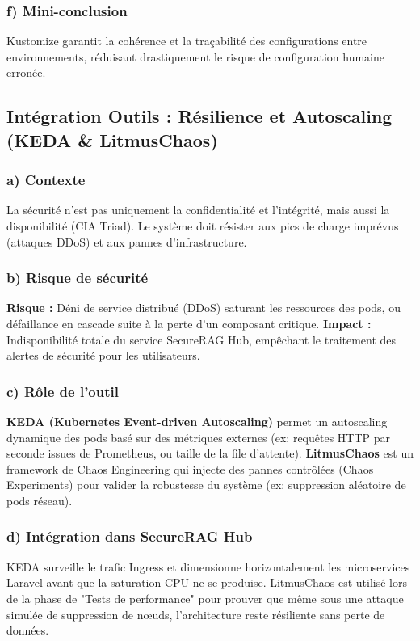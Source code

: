 \subsubsection{f) Mini-conclusion}
Kustomize garantit la cohérence et la traçabilité des configurations entre environnements, réduisant drastiquement le risque de configuration humaine erronée.

\subsection{Intégration Outils : Résilience et Autoscaling (KEDA \& LitmusChaos)}

\subsubsection{a) Contexte}
La sécurité n'est pas uniquement la confidentialité et l'intégrité, mais aussi la disponibilité (CIA Triad). Le système doit résister aux pics de charge imprévus (attaques DDoS) et aux pannes d'infrastructure.

\subsubsection{b) Risque de sécurité}
\textbf{Risque :} Déni de service distribué (DDoS) saturant les ressources des pods, ou défaillance en cascade suite à la perte d'un composant critique.
\textbf{Impact :} Indisponibilité totale du service SecureRAG Hub, empêchant le traitement des alertes de sécurité pour les utilisateurs.

\subsubsection{c) Rôle de l'outil}
\textbf{KEDA (Kubernetes Event-driven Autoscaling)} permet un autoscaling dynamique des pods basé sur des métriques externes (ex: requêtes HTTP par seconde issues de Prometheus, ou taille de la file d'attente).
\textbf{LitmusChaos} est un framework de Chaos Engineering qui injecte des pannes contrôlées (Chaos Experiments) pour valider la robustesse du système (ex: suppression aléatoire de pods réseau).

\subsubsection{d) Intégration dans SecureRAG Hub}
KEDA surveille le trafic Ingress et dimensionne horizontalement les microservices Laravel avant que la saturation CPU ne se produise. LitmusChaos est utilisé lors de la phase de "Tests de performance" pour prouver que même sous une attaque simulée de suppression de nœuds, l'architecture reste résiliente sans perte de données.

